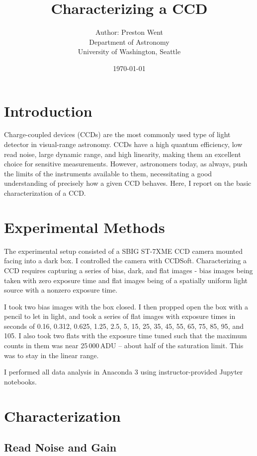 \documentclass[12pt,letterpaper]{report}
\title{
	Characterizing a CCD
}
\author{
	Author: Preston Went \\
	Department of Astronomy \\
	University of Washington, Seattle \\}
\date{\today}
\begin{document}
\maketitle

\section*{Introduction}

Charge-coupled devices (CCDs) are the most commonly used type of light detector in visual-range astronomy. CCDs have a high quantum efficiency, low read noise, large dynamic range, and high linearity, making them an excellent choice for sensitive measurements. However, astronomers today, as always, push the limits of the instruments available to them, necessitating a good understanding of precisely how a given CCD behaves. Here, I report on the basic characterization of a CCD.

\section*{Experimental Methods}

The experimental setup consisted of a SBIG ST-7XME CCD camera mounted facing into a dark box. I controlled the camera with CCDSoft. Characterizing a CCD requires capturing a series of bias, dark, and flat images - bias images being taken with zero exposure time and flat images being of a spatially uniform light source with a nonzero exposure time.

I took two bias images with the box closed. I then propped open the box with a pencil to let in light, and took a series of flat images with exposure times in seconds of 0.16, 0.312, 0.625, 1.25, 2.5, 5, 15, 25, 35, 45, 55, 65, 75, 85, 95, and 105. I also took two flats with the exposure time tuned such that the maximum counts in them was near 25$\,$000$\,$ADU -- about half of the saturation limit. This was to stay in the linear range.

I performed all data analysis in Anaconda 3 using instructor-provided Jupyter notebooks.

\section*{Characterization}

\subsection*{Read Noise and Gain}
\end{document}
